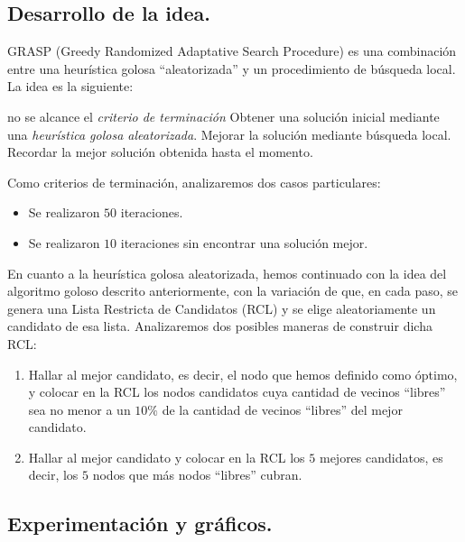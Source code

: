 \subsection{Desarrollo de la idea.}

\vspace*{0.3cm}

GRASP (Greedy Randomized Adaptative Search Procedure) es una combinación entre una heurística golosa ``aleatorizada'' y un procedimiento de búsqueda local.  La idea es la siguiente:

\begin{codebox}
\li \While no se alcance el {\it criterio de terminación}
\li \Do 
		Obtener una solución inicial mediante una {\it heurística golosa aleatorizada}.
\li 		Mejorar la solución mediante búsqueda local.
\li 		Recordar la mejor solución obtenida hasta el momento.
	\End
\end{codebox}

Como criterios de terminación, analizaremos dos casos particulares:

\begin{itemize}
\item Se realizaron $50$ iteraciones.
\item Se realizaron $10$ iteraciones sin encontrar una solución mejor.
\end{itemize}

En cuanto a la heurística golosa aleatorizada, hemos continuado con la idea del algoritmo goloso descrito anteriormente, con la variación de que, en cada paso, se genera una Lista Restricta de Candidatos (RCL) y se elige aleatoriamente un candidato de esa lista.  Analizaremos dos posibles maneras de construir dicha RCL:

\begin{enumerate}
\item Hallar al mejor candidato, es decir, el nodo que hemos definido como óptimo, y colocar en la RCL los nodos candidatos cuya cantidad de vecinos ``libres'' sea no menor a un $10 \%$ de la cantidad de vecinos ``libres'' del mejor candidato.
\item Hallar al mejor candidato y colocar en la RCL los $5$ mejores candidatos, es decir, los $5$ nodos que más nodos ``libres'' cubran.
\end{enumerate}

\vspace*{0.6cm}

\subsection{Experimentación y gráficos.}

